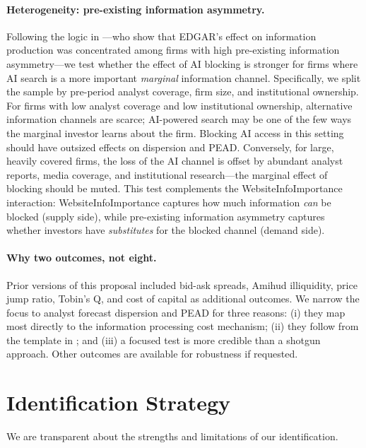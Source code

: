 \documentclass[12pt,a4paper]{article}
\begin{document}
\paragraph{Heterogeneity: pre-existing information asymmetry.} Following the logic in \citet{GaoHuang2020}---who show that EDGAR's effect on information production was concentrated among firms with high pre-existing information asymmetry---we test whether the effect of AI blocking is stronger for firms where AI search is a more important \emph{marginal} information channel. Specifically, we split the sample by pre-period analyst coverage, firm size, and institutional ownership. For firms with low analyst coverage and low institutional ownership, alternative information channels are scarce; AI-powered search may be one of the few ways the marginal investor learns about the firm. Blocking AI access in this setting should have outsized effects on dispersion and PEAD. Conversely, for large, heavily covered firms, the loss of the AI channel is offset by abundant analyst reports, media coverage, and institutional research---the marginal effect of blocking should be muted. This test complements the WebsiteInfoImportance interaction: WebsiteInfoImportance captures how much information \emph{can} be blocked (supply side), while pre-existing information asymmetry captures whether investors have \emph{substitutes} for the blocked channel (demand side).

\paragraph{Why two outcomes, not eight.} Prior versions of this proposal included bid-ask spreads, Amihud illiquidity, price jump ratio, Tobin's Q, and cost of capital as additional outcomes. We narrow the focus to analyst forecast dispersion and PEAD for three reasons: (i) they map most directly to the information processing cost mechanism; (ii) they follow from the template in \citet{ChenKellyWu2020}; and (iii) a focused test is more credible than a shotgun approach. Other outcomes are available for robustness if requested.

\section{Identification Strategy}

We are transparent about the strengths and limitations of our identification.
\end{document}
